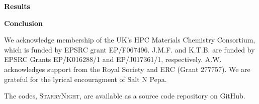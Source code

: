 \documentclass[journal=jacsat,manuscript=communication]{achemso}
\begin{document}
\textbf{Results}

\textbf{Conclusion}


\begin{acknowledgement}
We acknowledge membership of the UK's HPC Materials Chemistry Consortium, which is funded by EPSRC grant EP/F067496. 
J.M.F. and K.T.B. are funded by EPSRC Grants EP/K016288/1 and EP/J017361/1, respectively.
A.W. acknowledges support from the Royal Society and ERC (Grant 277757). 
We are grateful for the lyrical encouragment of Salt N Pepa. 
\end{acknowledgement}

\begin{suppinfo}
    The codes, \textsc{StarryNight}, are available as a source code repository on GitHub\cite{GitHub}.
\end{suppinfo}


\end{document}
